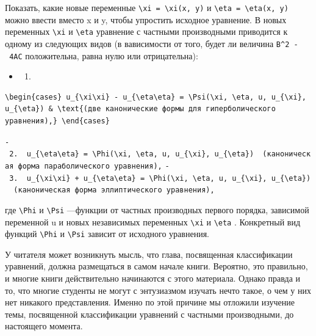 \documentclass[
  ukrainian,
]{article}
\providecommand{\tightlist}{%
  \setlength{\itemsep}{0pt}\setlength{\parskip}{0pt}}
\begin{document}
Показать, какие новые переменные
\texttt{\textbackslash{}xi\ =\ \textbackslash{}xi(x,\ y)} и
\texttt{\textbackslash{}eta\ =\ \textbackslash{}eta(x,\ y)} можно ввести
вместо x и y, чтобы упростить исходное уравнение. В новых переменных
\texttt{\textbackslash{}xi} и \texttt{\textbackslash{}eta} уравнение с
частными производными приводится к одному из следующих видов (в
вависимости от того, будет ли величина \texttt{B\^{}2\ -\ 4AC}
положительна, равна нулю или отрицательна):

\begin{itemize}
\tightlist
\item
  \begin{enumerate}
  \def\labelenumi{\arabic{enumi}.}
  \tightlist
  \item
  \end{enumerate}
\end{itemize}

\begin{verbatim}
\begin{cases} u_{\xi\xi} - u_{\eta\eta} = \Psi(\xi, \eta, u, u_{\xi}, u_{\eta}) & \text{(две канонические формы для гиперболического уравнения),} \end{cases}
\end{verbatim}

\texttt{-\ 2.\ \ \textquotesingle{}u\_\{\textbackslash{}eta\textbackslash{}eta\}\ =\ \textbackslash{}Phi(\textbackslash{}xi,\ \textbackslash{}eta,\ u,\ u\_\{\textbackslash{}xi\},\ u\_\{\textbackslash{}eta\})\textquotesingle{}\ \ (каноническая\ форма\ параболического\ уравнения),}
\texttt{-\ 3.\ \ \textquotesingle{}u\_\{\textbackslash{}xi\textbackslash{}xi\}\ +\ u\_\{\textbackslash{}eta\textbackslash{}eta\}\ =\ \textbackslash{}Phi(\textbackslash{}xi,\ \textbackslash{}eta,\ u,\ u\_\{\textbackslash{}xi\},\ u\_\{\textbackslash{}eta\})\textquotesingle{}\ \ (каноническая\ форма\ эллиптического\ уравнения),}

где \texttt{\textbackslash{}Phi} и \texttt{\textbackslash{}Psi}
---функции от частных производных первого порядка, зависимой переменной
u и новых независимых переменных \texttt{\textbackslash{}xi} и
\texttt{\textbackslash{}eta} . Конкретный вид функций
\texttt{\textbackslash{}Phi} и \texttt{\textbackslash{}Psi} зависит от
исходного уравнения.

У читателя может возникнуть мысль, что глава, посвященная классификации
уравнений, должна размещаться в самом начале книги. Вероятно, это
правильно, и многие книги действительно начинаются с этого материала.
Однако правда и то, что многие студенты не могут с энтузиазмом изучать
нечто такое, о чем у них нет никакого представления. Именно по этой
причине мы отложили изучение темы, посвященной классификации уравнений с
частными производными, до настоящего момента.
\end{document}
